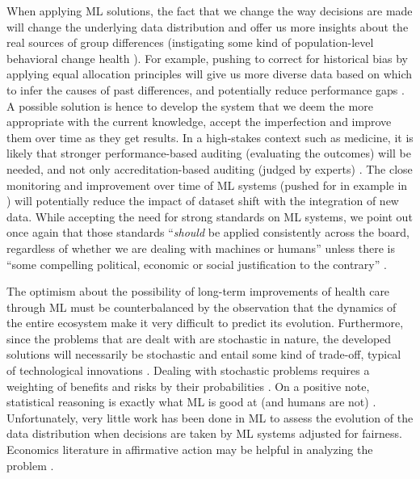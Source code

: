     When applying ML solutions, the fact that we change the way decisions are made will change the underlying data distribution and offer us more insights about the real sources of group differences (instigating some kind of population-level behavioral change health \cite{Morley2020}).
    For example, pushing to correct for historical bias by applying equal allocation principles \cite{Rajkomar2018} will give us more diverse data based on which to infer the causes of past differences, and potentially reduce performance gaps \cite{Chen2021}.
    A possible solution is hence to develop the system that we deem the more appropriate with the current knowledge, accept the imperfection and improve them over time as they get results.
    In a high-stakes context such as medicine, it is likely that stronger performance-based auditing (evaluating the outcomes) will be needed, and not only accreditation-based auditing (judged by experts) \cite{Zerilli2019}.
    The close monitoring and improvement over time of ML systems (pushed for in example in \cite{Rajkomar2018}) will potentially reduce the impact of dataset shift with the integration of new data.
    While accepting the need for strong standards on ML systems, we point out once again that those standards ``\emph{should} be applied consistently across the board, regardless of whether we are dealing with machines or humans'' unless there is ``some compelling political, economic or social justification to the contrary'' \cite[p.~678]{Zerilli2019}.

    The optimism about the possibility of long-term improvements of health care through ML must be counterbalanced by the observation that the dynamics of the entire ecosystem make it very difficult to predict its evolution.
    Furthermore, since the problems that are dealt with are stochastic in nature, the developed solutions will necessarily be stochastic and entail some kind of trade-off, typical of technological innovations \cite{Hardin1989}.
    Dealing with stochastic problems requires a weighting of benefits and risks by their probabilities \cite{Hardin1989}.
    On a positive note, statistical reasoning is exactly what ML is good at (and humans are not) \cite{Williamson2021}.
    Unfortunately, very little work has been done in ML to assess the evolution of the data distribution when decisions are taken by ML systems adjusted for fairness.
    Economics literature in affirmative action may be helpful in analyzing the problem \cite{Chouldechova2020}.
